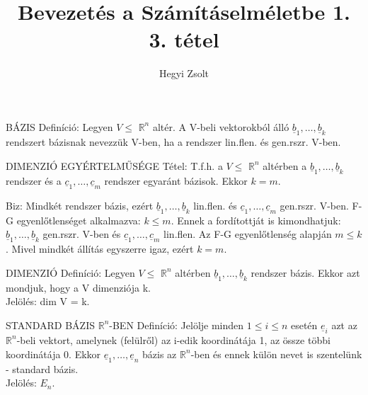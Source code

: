 \documentclass[]{article}
\title{Bevezetés a Számításelméletbe 1.\\{\large 3. tétel}}
\author{Hegyi Zsolt}
\newcommand{\Rn}[1]{$\mathbb{R}^{#1}$}
\newcommand{\Und}[1]{\underline{#1}}
\begin{document}
\maketitle{}
\begin{shaded}
BÁZIS Definíció: Legyen $V \leq$ \Rn{n} altér. A V-beli vektorokból álló $\Und{b}_1,\ldots,\Und{b}_k$ rendszert bázisnak nevezzük V-ben, ha a rendszer lin.flen. és gen.rszr. V-ben.
\end{shaded}
\begin{framed}
DIMENZIÓ EGYÉRTELMŰSÉGE Tétel: T.f.h. a $V \leq$ \Rn{n} altérben a $\Und{b}_1,\ldots,\Und{b}_k$ rendszer és a $\Und{c}_1,\ldots,\Und{c}_m$ rendszer egyaránt bázisok. Ekkor $k = m$.
\end{framed}
\begin{leftbar}
Biz: Mindkét rendszer bázis, ezért $\Und{b}_1,\ldots,\Und{b}_k$ lin.flen. és $\Und{c}_1,\ldots,\Und{c}_m$ gen.rszr. V-ben. F-G egyenlőtlenséget alkalmazva: $k \leq m$. Ennek a fordítottját is kimondhatjuk: $\Und{b}_1,\ldots,\Und{b}_k$ gen.rszr. V-ben és $\Und{c}_1,\ldots,\Und{c}_m$ lin.flen. Az F-G egyenlőtlenség alapján $m \leq k$. Mivel mindkét állítás egyszerre igaz, ezért $k = m$.
\end{leftbar}
\begin{shaded}
DIMENZIÓ Definíció: Legyen $V \leq$ \Rn{n} altérben $\Und{b}_1,\ldots,\Und{b}_k$ rendszer bázis. Ekkor azt mondjuk, hogy a V dimenziója k.\\
Jelölés: dim V = k.
\end{shaded}
\begin{shaded}
STANDARD BÁZIS \Rn{n}-BEN Definíció: Jelölje minden $1 \leq i \leq n$ esetén $\Und{e}_i$ azt az \Rn{n}-beli vektort, amelynek (felülről) az i-edik koordinátája 1, az össze többi koordinátája 0. Ekkor $\Und{e}_1,\ldots,\Und{e}_n$ bázis az \Rn{n}-ben és ennek külön nevet is szentelünk - standard bázis.\\Jelölés: $E_n$.
\end{shaded}
\end{document}
